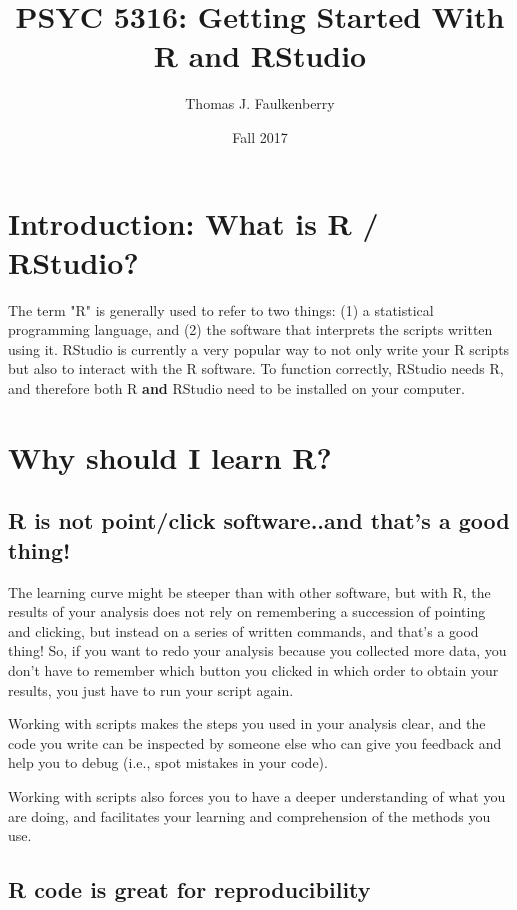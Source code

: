 \documentclass[11pt]{article}
\author{Thomas J. Faulkenberry}
\date{Fall 2017}
\title{PSYC 5316: Getting Started With R and RStudio}
\begin{document}
\maketitle
\tableofcontents


\section*{Introduction: What is R / RStudio?}
\label{sec-1}

The term "R" is generally used to refer to two things: (1) a statistical programming language, and (2) the software that interprets the scripts written using it.  RStudio is currently a very popular way to not only write your R scripts but also to interact with the R software. To function correctly, RStudio needs R, and therefore both R \textbf{and} RStudio need to be installed on your computer.

\section*{Why should I learn R?}
\label{sec-2}

\subsection*{R is not point/click software..and that's a good thing!}
\label{sec-2-1}

The learning curve might be steeper than with other software, but with R, the results of your analysis does not rely on remembering a succession of pointing and clicking, but instead on a series of written commands, and that's a good thing! So, if you want to redo your analysis because you collected more data, you don't have to remember which button you clicked in which order to obtain your results, you just have to run your script again.

Working with scripts makes the steps you used in your analysis clear, and the code you write can be inspected by someone else who can give you feedback and help you to debug (i.e., spot mistakes in your code).

Working with scripts also forces you to have a deeper understanding of what you are doing, and facilitates your learning and comprehension of the methods you use.

\subsection*{R code is great for reproducibility}
\label{sec-2-2}
\end{document}
